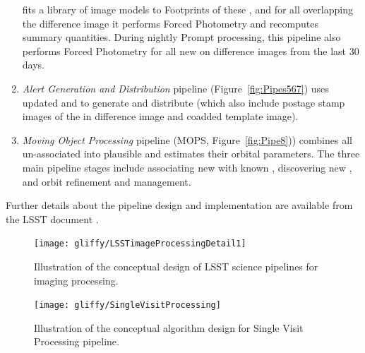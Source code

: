 \documentclass[SE,lsstdraft,toc]{lsstdoc}
\begin{document}
\begin{enumerate}
fits a library of image models to Footprints of these \DIASources, and for all \DIAObjects
overlapping the difference image it performs Forced Photometry and recomputes summary quantities.
During nightly Prompt processing, this pipeline also performs Forced Photometry
for all new \DIAObjects on difference images from the last 30 days.
\item \textit{Alert Generation and Distribution} pipeline (Figure~\ref{fig:Pipes567}) uses updated
\DIAObjects and \DIASources to generate and distribute \Alerts (which also include postage stamp
images of the \DIASource in difference image and coadded template image).
\item \textit{Moving Object Processing} pipeline (MOPS, Figure~\ref{fig:Pipe8})) combines all
un-associated \DIASources into plausible \SSObjects and estimates their orbital parameters.
The three main pipeline stages include associating new \DIASources with known \SSObjects,
discovering new \SSObjects, and orbit refinement and management.
\end{enumerate}

Further details about the pipeline design and implementation are available from the LSST
document .

\begin{figure}[!t]
    \centering
    \vskip -0.1in
    \texttt{[image: gliffy/LSSTimageProcessingDetail1]}
    \vskip -0.1in
    \caption{Illustration of the conceptual design of LSST science pipelines for imaging processing.\label{fig:Detail1}}
\end{figure}


\begin{figure}[!t]
    \centering
    \vskip -1.1in
    \texttt{[image: gliffy/SingleVisitProcessing]}
    \vskip -1.1in
    \caption{Illustration of the conceptual algorithm design for Single Visit Processing pipeline.\label{fig:Pipe1}}
\end{figure}
\end{document}
